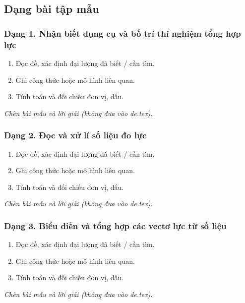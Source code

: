 

\subsection{Dạng bài tập mẫu}
\subsubsection{Dạng 1. Nhận biết dụng cụ và bố trí thí nghiệm tổng hợp lực}
\begin{phuongphap}
\begin{enumerate}
\item Đọc đề, xác định đại lượng đã biết / cần tìm.
\item Ghi công thức hoặc mô hình liên quan.
\item Tính toán và đối chiếu đơn vị, dấu.
\end{enumerate}
\end{phuongphap}
\begin{vidumau}
\textit{Chèn bài mẫu và lời giải (không đưa vào de.tex).}
\end{vidumau}

\subsubsection{Dạng 2. Đọc và xử lí số liệu đo lực}
\begin{phuongphap}
\begin{enumerate}
\item Đọc đề, xác định đại lượng đã biết / cần tìm.
\item Ghi công thức hoặc mô hình liên quan.
\item Tính toán và đối chiếu đơn vị, dấu.
\end{enumerate}
\end{phuongphap}
\begin{vidumau}
\textit{Chèn bài mẫu và lời giải (không đưa vào de.tex).}
\end{vidumau}

\subsubsection{Dạng 3. Biểu diễn và tổng hợp các vectơ lực từ số liệu}
\begin{phuongphap}
\begin{enumerate}
\item Đọc đề, xác định đại lượng đã biết / cần tìm.
\item Ghi công thức hoặc mô hình liên quan.
\item Tính toán và đối chiếu đơn vị, dấu.
\end{enumerate}
\end{phuongphap}
\begin{vidumau}
\textit{Chèn bài mẫu và lời giải (không đưa vào de.tex).}
\end{vidumau}

